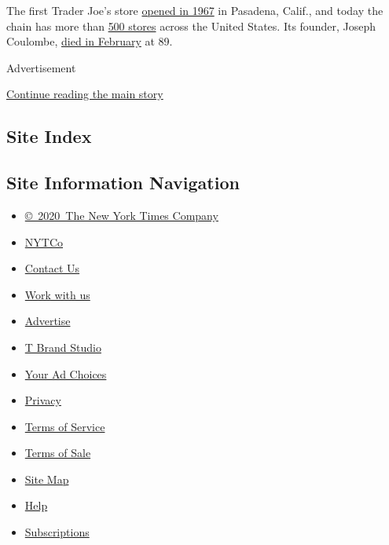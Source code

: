 The first Trader Joe's store
\href{https://www.traderjoes.com/our-story/timeline}{opened in 1967} in
Pasadena, Calif., and today the chain has more than
\href{https://www.traderjoes.com/our-story}{500 stores} across the
United States. Its founder, Joseph Coulombe,
\href{https://www.nytimes.com/2020/02/29/business/joe-coulombe-dead.html}{died
in February} at 89.

Advertisement

\protect\hyperlink{after-bottom}{Continue reading the main story}

\hypertarget{site-index}{%
\subsection{Site Index}\label{site-index}}

\hypertarget{site-information-navigation}{%
\subsection{Site Information
Navigation}\label{site-information-navigation}}

\begin{itemize}
\tightlist
\item
  \href{https://help.nytimes.com/hc/en-us/articles/115014792127-Copyright-notice}{©~2020~The
  New York Times Company}
\end{itemize}

\begin{itemize}
\tightlist
\item
  \href{https://www.nytco.com/}{NYTCo}
\item
  \href{https://help.nytimes.com/hc/en-us/articles/115015385887-Contact-Us}{Contact
  Us}
\item
  \href{https://www.nytco.com/careers/}{Work with us}
\item
  \href{https://nytmediakit.com/}{Advertise}
\item
  \href{http://www.tbrandstudio.com/}{T Brand Studio}
\item
  \href{https://www.nytimes.com/privacy/cookie-policy\#how-do-i-manage-trackers}{Your
  Ad Choices}
\item
  \href{https://www.nytimes.com/privacy}{Privacy}
\item
  \href{https://help.nytimes.com/hc/en-us/articles/115014893428-Terms-of-service}{Terms
  of Service}
\item
  \href{https://help.nytimes.com/hc/en-us/articles/115014893968-Terms-of-sale}{Terms
  of Sale}
\item
  \href{https://spiderbites.nytimes.com}{Site Map}
\item
  \href{https://help.nytimes.com/hc/en-us}{Help}
\item
  \href{https://www.nytimes.com/subscription?campaignId=37WXW}{Subscriptions}
\end{itemize}
